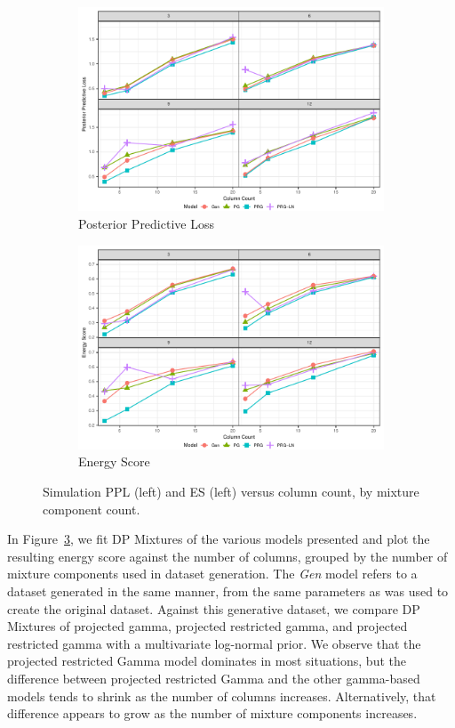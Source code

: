 \begin{figure}[ht]
  \begin{subfigure}[b]{0.45\textwidth}
    \includegraphics[width=\textwidth]{./images/simulation_ppl}
    \caption{Posterior Predictive Loss\label{fig:simppl}}
  \end{subfigure}
  \begin{subfigure}[b]{0.45\textwidth}
    \includegraphics[width=\textwidth]{./images/simulation_es}
    \caption{Energy Score\label{fig:simes}}
  \end{subfigure}
  \caption{Simulation PPL (left) and ES (left) versus column count, by mixture component count.}
\end{figure}

In Figure~\ref{fig:simes}, we fit DP Mixtures of the various models presented and plot the resulting
  energy score against the number of columns, grouped by the number of mixture components used in
  dataset generation.  The \emph{Gen} model refers to a dataset generated
  in the same manner, from the same parameters as was used to create the original dataset.  Against
  this generative dataset, we compare DP Mixtures of projected gamma, projected restricted gamma, and
  projected restricted gamma with a multivariate log-normal prior.  We observe that the projected
  restricted Gamma model dominates in most situations, but the difference between projected restricted
  Gamma and the other gamma-based models tends to shrink as the number of columns increases.
  Alternatively, that difference appears to grow as the number of mixture components increases.

